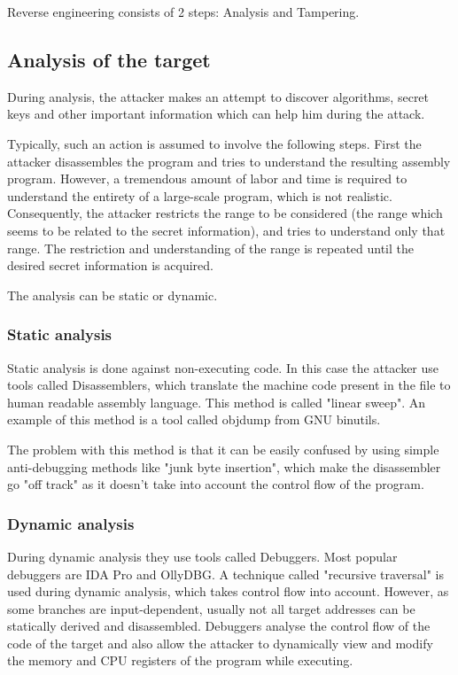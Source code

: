 \documentclass[a4paper,12pt]{article}
\begin{document}
Reverse engineering consists of 2 steps: Analysis and Tampering.

\subsection{Analysis of the target}
During analysis, the attacker makes an attempt to discover algorithms, secret keys and other important information which can help him during the attack.

Typically, such an action is assumed to involve the following steps. First the
attacker disassembles the program and tries to understand the resulting
assembly program. However, a tremendous amount of labor and time is required
to understand the entirety of a large-scale program, which is not realistic.
Consequently, the attacker restricts the range to be considered (the range
which seems to be related to the secret information), and tries to understand
only that range. The restriction and understanding of the range is repeated
until the desired secret information is acquired.

The analysis can be static or dynamic.

\subsubsection{Static analysis}
Static analysis is done against non-executing code. In this case the attacker
use tools called Disassemblers, which translate the machine code present in the
file to human readable assembly language. This method is called "linear sweep".
An example of this method is a tool called objdump from GNU binutils.

The problem with this method is that it can be easily confused by using simple
anti-debugging methods like "junk byte insertion", which make the disassembler
go "off track" as it doesn't take into account the control flow of the program.

\subsubsection{Dynamic analysis}
During dynamic analysis they use tools called Debuggers. Most popular debuggers
are IDA Pro and OllyDBG. A technique called "recursive traversal" is used
during dynamic analysis, which takes control flow into account. However, as
some branches are input-dependent, usually not all target addresses can be
statically derived and disassembled. Debuggers analyse the control flow of the
code of the target and also allow the attacker to dynamically view and modify
the memory and CPU registers of the program while executing. 
\end{document}
